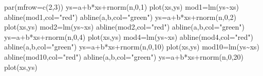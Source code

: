 \documentclass[
]{book}
\newenvironment{Shaded}{\begin{snugshade}}{\end{snugshade}}
\newcommand{\AttributeTok}[1]{\textcolor[rgb]{0.77,0.63,0.00}{#1}}
\newcommand{\DecValTok}[1]{\textcolor[rgb]{0.00,0.00,0.81}{#1}}
\newcommand{\FunctionTok}[1]{\textcolor[rgb]{0.00,0.00,0.00}{#1}}
\newcommand{\NormalTok}[1]{#1}
\newcommand{\OtherTok}[1]{\textcolor[rgb]{0.56,0.35,0.01}{#1}}
\newcommand{\SpecialCharTok}[1]{\textcolor[rgb]{0.00,0.00,0.00}{#1}}
\newcommand{\StringTok}[1]{\textcolor[rgb]{0.31,0.60,0.02}{#1}}
\begin{document}
\begin{Shaded}
\begin{Highlighting}[]
\FunctionTok{par}\NormalTok{(}\AttributeTok{mfrow=}\FunctionTok{c}\NormalTok{(}\DecValTok{2}\NormalTok{,}\DecValTok{3}\NormalTok{))}
\NormalTok{ys}\OtherTok{=}\NormalTok{a}\SpecialCharTok{+}\NormalTok{b}\SpecialCharTok{*}\NormalTok{xs}\SpecialCharTok{+}\FunctionTok{rnorm}\NormalTok{(n,}\DecValTok{0}\NormalTok{,}\DecValTok{1}\NormalTok{)}
\FunctionTok{plot}\NormalTok{(xs,ys)}
\NormalTok{mod1}\OtherTok{=}\FunctionTok{lm}\NormalTok{(ys}\SpecialCharTok{\textasciitilde{}}\NormalTok{xs)}
\FunctionTok{abline}\NormalTok{(mod1,}\AttributeTok{col=}\StringTok{"red"}\NormalTok{)}
\FunctionTok{abline}\NormalTok{(a,b,}\AttributeTok{col=}\StringTok{"green"}\NormalTok{)}
\NormalTok{ys}\OtherTok{=}\NormalTok{a}\SpecialCharTok{+}\NormalTok{b}\SpecialCharTok{*}\NormalTok{xs}\SpecialCharTok{+}\FunctionTok{rnorm}\NormalTok{(n,}\DecValTok{0}\NormalTok{,}\DecValTok{2}\NormalTok{)}
\FunctionTok{plot}\NormalTok{(xs,ys)}
\NormalTok{mod2}\OtherTok{=}\FunctionTok{lm}\NormalTok{(ys}\SpecialCharTok{\textasciitilde{}}\NormalTok{xs)}
\FunctionTok{abline}\NormalTok{(mod2,}\AttributeTok{col=}\StringTok{"red"}\NormalTok{)}
\FunctionTok{abline}\NormalTok{(a,b,}\AttributeTok{col=}\StringTok{"green"}\NormalTok{)}
\NormalTok{ys}\OtherTok{=}\NormalTok{a}\SpecialCharTok{+}\NormalTok{b}\SpecialCharTok{*}\NormalTok{xs}\SpecialCharTok{+}\FunctionTok{rnorm}\NormalTok{(n,}\DecValTok{0}\NormalTok{,}\DecValTok{4}\NormalTok{)}
\FunctionTok{plot}\NormalTok{(xs,ys)}
\NormalTok{mod4}\OtherTok{=}\FunctionTok{lm}\NormalTok{(ys}\SpecialCharTok{\textasciitilde{}}\NormalTok{xs)}
\FunctionTok{abline}\NormalTok{(mod4,}\AttributeTok{col=}\StringTok{"red"}\NormalTok{)}
\FunctionTok{abline}\NormalTok{(a,b,}\AttributeTok{col=}\StringTok{"green"}\NormalTok{)}
\NormalTok{ys}\OtherTok{=}\NormalTok{a}\SpecialCharTok{+}\NormalTok{b}\SpecialCharTok{*}\NormalTok{xs}\SpecialCharTok{+}\FunctionTok{rnorm}\NormalTok{(n,}\DecValTok{0}\NormalTok{,}\DecValTok{10}\NormalTok{)}
\FunctionTok{plot}\NormalTok{(xs,ys)}
\NormalTok{mod10}\OtherTok{=}\FunctionTok{lm}\NormalTok{(ys}\SpecialCharTok{\textasciitilde{}}\NormalTok{xs)}
\FunctionTok{abline}\NormalTok{(mod10,}\AttributeTok{col=}\StringTok{"red"}\NormalTok{)}
\FunctionTok{abline}\NormalTok{(a,b,}\AttributeTok{col=}\StringTok{"green"}\NormalTok{)}
\NormalTok{ys}\OtherTok{=}\NormalTok{a}\SpecialCharTok{+}\NormalTok{b}\SpecialCharTok{*}\NormalTok{xs}\SpecialCharTok{+}\FunctionTok{rnorm}\NormalTok{(n,}\DecValTok{0}\NormalTok{,}\DecValTok{20}\NormalTok{)}
\FunctionTok{plot}\NormalTok{(xs,ys)}

\end{Highlighting}
\end{Shaded}
\end{document}
